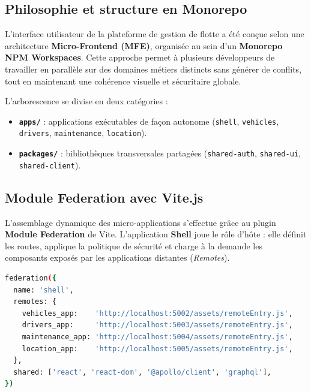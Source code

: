 \documentclass[12pt,a4paper]{article}
\begin{document}
\subsection{Philosophie et structure en Monorepo}

L'interface utilisateur de la plateforme de gestion de flotte a \'{e}t\'{e} con\c{c}ue selon une architecture \textbf{Micro-Frontend (MFE)}, organis\'{e}e au sein d'un \textbf{Monorepo NPM Workspaces}. Cette approche permet \`{a} plusieurs d\'{e}veloppeurs de travailler en parall\`{e}le sur des domaines m\'{e}tiers distincts sans g\'{e}n\'{e}rer de conflits, tout en maintenant une coh\'{e}rence visuelle et s\'{e}curitaire globale.

L'arborescence se divise en deux cat\'{e}gories :

\begin{itemize}[leftmargin=*]
  \item \textbf{\texttt{apps/}} : applications ex\'{e}cutables de fa\c{c}on autonome (\texttt{shell}, \texttt{vehicles}, \texttt{drivers}, \texttt{maintenance}, \texttt{location}).
  \item \textbf{\texttt{packages/}} : biblioth\`{e}ques transversales partag\'{e}es (\texttt{shared-auth}, \texttt{shared-ui}, \texttt{shared-client}).
\end{itemize}

\subsection{Module Federation avec Vite.js}

L'assemblage dynamique des micro-applications s'effectue gr\^{a}ce au plugin \textbf{Module Federation} de Vite. L'application \textbf{Shell} joue le r\^{o}le d'h\^{o}te : elle d\'{e}finit les routes, applique la politique de s\'{e}curit\'{e} et charge \`{a} la demande les composants expos\'{e}s par les applications distantes (\textit{Remotes}).

\begin{lstlisting}[language=bash, caption=Configuration Module Federation --- shell/vite.config.ts]
federation({
  name: 'shell',
  remotes: {
    vehicles_app:    'http://localhost:5002/assets/remoteEntry.js',
    drivers_app:     'http://localhost:5003/assets/remoteEntry.js',
    maintenance_app: 'http://localhost:5004/assets/remoteEntry.js',
    location_app:    'http://localhost:5005/assets/remoteEntry.js',
  },
  shared: ['react', 'react-dom', '@apollo/client', 'graphql'],
})
\end{lstlisting}
\end{document}
